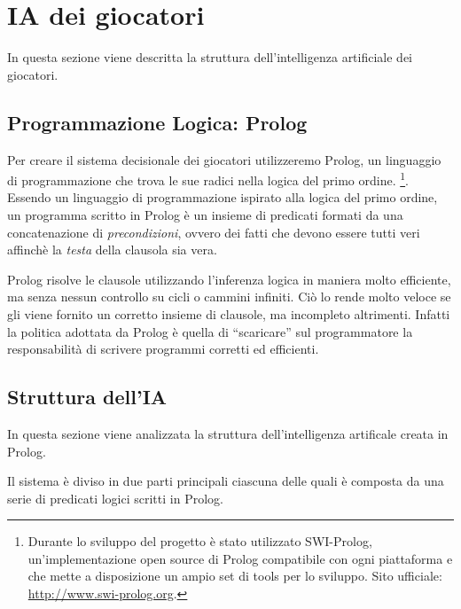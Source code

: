 
\section{IA dei giocatori}
\label{sec:ai_giocatori}

In questa sezione viene descritta la struttura dell'intelligenza artificiale dei giocatori.

\subsection{Programmazione Logica: Prolog}
Per creare il sistema decisionale dei giocatori utilizzeremo Prolog, un linguaggio di programmazione che trova le sue radici nella logica del primo ordine.
\footnote{Durante lo sviluppo del progetto \`{e} stato utilizzato SWI-Prolog, un'implementazione open source di Prolog compatibile con ogni piattaforma e che mette a disposizione un ampio set di tools per lo sviluppo. Sito ufficiale: \href{http://www.swi-prolog.org/}{http://www.swi-prolog.org}.}.
Essendo un linguaggio di programmazione ispirato alla logica del primo ordine, un programma scritto in Prolog \`{e} un insieme di predicati formati da una concatenazione di \emph{precondizioni}, ovvero dei fatti che devono essere tutti veri affinch\`{e} la \emph{testa} della clausola sia vera.

Prolog risolve le clausole utilizzando l'inferenza logica in maniera molto efficiente, ma senza nessun controllo su cicli o cammini infiniti. Ci\`{o} lo rende molto veloce se gli viene fornito un corretto insieme di clausole, ma incompleto altrimenti. Infatti la politica adottata da Prolog \`{e} quella di ``scaricare'' sul programmatore la responsabilit\`{a} di scrivere programmi corretti ed efficienti.\\

\subsection{Struttura dell'IA}
\label{sec:struct_ia}
In questa sezione viene analizzata la struttura dell'intelligenza artificale creata in Prolog.

Il sistema \`{e} diviso in due parti principali ciascuna delle quali \`{e} composta da una serie di predicati logici scritti in Prolog.

